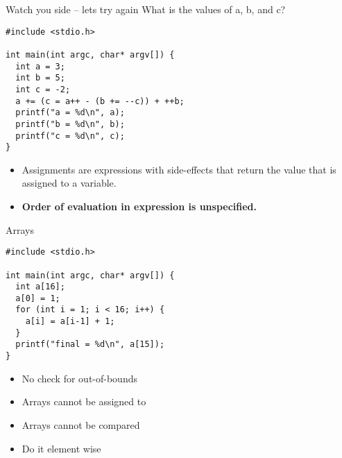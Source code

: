 \documentclass{beamer}
\begin{document}
\begin{frame}[fragile]{Watch you side -- lets try again}
What is the values of a, b, and c?
\begin{lstlisting}[frame=single]
#include <stdio.h>

int main(int argc, char* argv[]) {
  int a = 3;
  int b = 5;
  int c = -2;
  a += (c = a++ - (b += --c)) + ++b;
  printf("a = %d\n", a);
  printf("b = %d\n", b);
  printf("c = %d\n", c);
}
\end{lstlisting}
\pause
\begin{itemize}
\item Assignments are expressions with side-effects that return the
  value that is assigned to a variable.
\item \textbf{Order of evaluation in expression is unspecified.}
\end{itemize}
\end{frame}


\begin{frame}[fragile]{Arrays}
\begin{lstlisting}[frame=single]
#include <stdio.h>

int main(int argc, char* argv[]) {
  int a[16];
  a[0] = 1;
  for (int i = 1; i < 16; i++) {
    a[i] = a[i-1] + 1;
  }
  printf("final = %d\n", a[15]);
}
\end{lstlisting}
\begin{itemize}
\item No check for out-of-bounds
\item Arrays cannot be assigned to
\item Arrays cannot be compared
\item Do it element wise
\end{itemize}
\end{frame}





\end{document}
